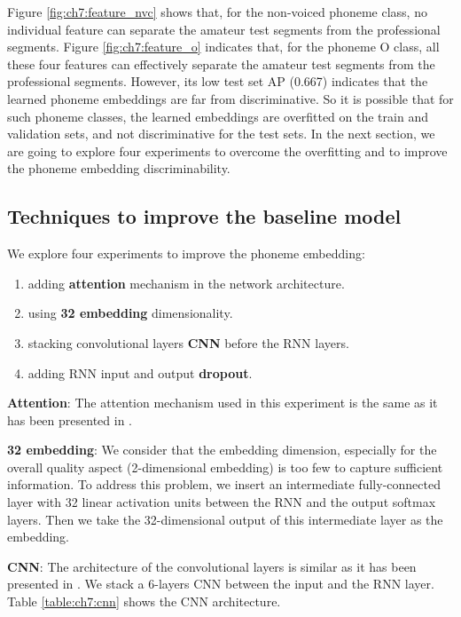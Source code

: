 Figure \ref{fig:ch7:feature_nvc} shows that, for the non-voiced phoneme class, no individual feature can separate the amateur test segments from the professional segments. Figure \ref{fig:ch7:feature_o} indicates that, for the phoneme O class, all these four features can effectively separate the amateur test segments from the professional segments. However, its low test set AP (0.667) indicates that the learned phoneme embeddings are far from discriminative. So it is possible that for such phoneme classes, the learned embeddings are overfitted on the train and validation sets, and not discriminative for the test sets. In the next section, we are going to explore four experiments to overcome the overfitting and to improve the phoneme embedding discriminability.

\subsection{Techniques to improve the baseline model}

We explore four experiments to improve the phoneme embedding:

\begin{enumerate}
\item adding \textbf{attention} mechanism in the network architecture.
\item using \textbf{32 embedding} dimensionality.
\item stacking convolutional layers \textbf{CNN} before the RNN layers.
\item adding RNN input and output \textbf{dropout}.
\end{enumerate}

\textbf{Attention}: The attention mechanism used in this experiment is the same as it has been presented in .

\textbf{32 embedding}: We consider that the embedding dimension, especially for the overall quality aspect (2-dimensional embedding) is too few to capture sufficient information. To address this problem, we insert an intermediate fully-connected layer with 32 linear activation units between the RNN and the output softmax layers. Then we take the 32-dimensional output of this intermediate layer as the embedding.

\textbf{CNN}: The architecture of the convolutional layers is similar as it has been presented in . We stack a 6-layers CNN between the input and the RNN layer. Table \ref{table:ch7:cnn} shows the CNN architecture. 


